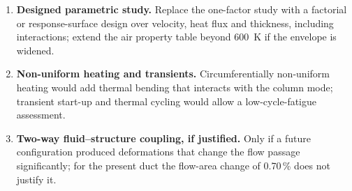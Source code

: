 \begin{enumerate}
\item \textbf{Designed parametric study.} Replace the one-factor study with a factorial or response-surface design over velocity, heat flux and
      thickness, including interactions; extend the air property table beyond 600~K if the envelope is widened.
\item \textbf{Non-uniform heating and transients.} Circumferentially non-uniform heating would add thermal bending that interacts with the column
      mode; transient start-up and thermal cycling would allow a low-cycle-fatigue assessment.
\item \textbf{Two-way fluid--structure coupling, if justified.} Only if a future configuration produced deformations that change the flow passage
      significantly; for the present duct the flow-area change of 0.70\,\% does not justify it.
\end{enumerate}
